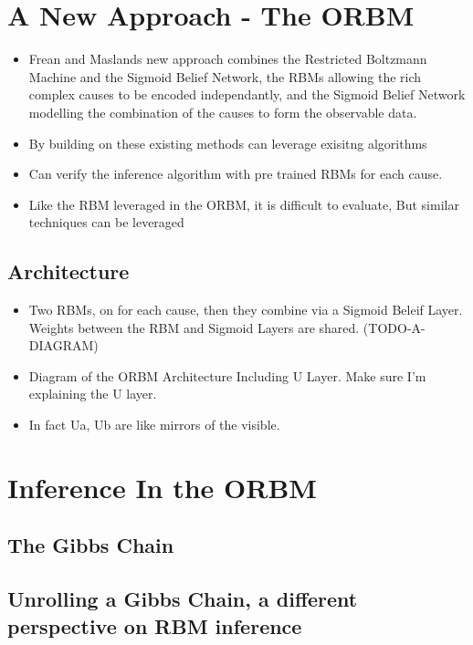 \section{A New Approach - The ORBM}

\begin{itemize}
  \item Frean and Maslands new approach combines the Restricted Boltzmann Machine and the Sigmoid Belief Network, the RBMs allowing the rich complex causes to be encoded independantly, and the Sigmoid Belief Network modelling the combination of the causes to form the observable data.
  \item By building on these existing methods can leverage exisitng algorithms
  \item Can verify the inference algorithm with pre trained RBMs for each cause. 
  \item Like the RBM leveraged in the ORBM, it is difficult to evaluate, But similar techniques can be leveraged
\end{itemize}

\subsection{Architecture}

\begin{itemize}
    \item Two RBMs, on for each cause, then they combine via a Sigmoid Beleif Layer. Weights between the RBM and Sigmoid Layers are shared. (TODO-A-DIAGRAM)
    \item Diagram of the ORBM Architecture Including U Layer. Make sure I'm explaining the U layer.
    \item In fact Ua, Ub are like mirrors of the visible.
\end{itemize}


\section{Inference In the ORBM }

\subsection{The Gibbs Chain}


\subsection{Unrolling a Gibbs Chain, a different perspective on RBM inference}

